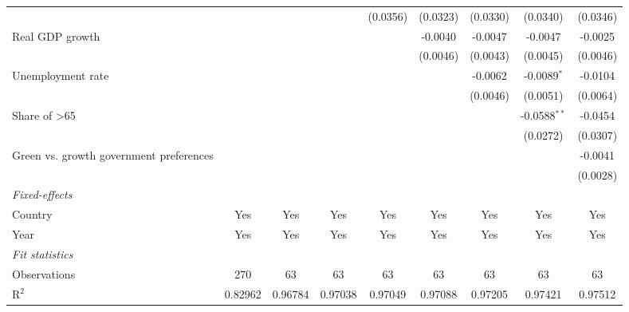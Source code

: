 \begin{table}[htbp]
\begin{tabular}{lcccccccc}
                                                              &          &          &          & (0.0356) & (0.0323) & (0.0330) & (0.0340)       & (0.0346)\\   
      Real GDP growth                                         &          &          &          &          & -0.0040  & -0.0047  & -0.0047        & -0.0025\\   
                                                              &          &          &          &          & (0.0046) & (0.0043) & (0.0045)       & (0.0046)\\   
      Unemployment rate                                       &          &          &          &          &          & -0.0062  & -0.0089$^{*}$  & -0.0104\\   
                                                              &          &          &          &          &          & (0.0046) & (0.0051)       & (0.0064)\\   
      Share of >65                                            &          &          &          &          &          &          & -0.0588$^{**}$ & -0.0454\\   
                                                              &          &          &          &          &          &          & (0.0272)       & (0.0307)\\   
      Green vs. growth government preferences                 &          &          &          &          &          &          &                & -0.0041\\   
                                                              &          &          &          &          &          &          &                & (0.0028)\\   
      \midrule
      \emph{Fixed-effects}\\
      Country                                                 & Yes      & Yes      & Yes      & Yes      & Yes      & Yes      & Yes            & Yes\\  
      Year                                                    & Yes      & Yes      & Yes      & Yes      & Yes      & Yes      & Yes            & Yes\\  
      \midrule
      \emph{Fit statistics}\\
      Observations                                            & 270      & 63       & 63       & 63       & 63       & 63       & 63             & 63\\  
      R$^2$                                                   & 0.82962  & 0.96784  & 0.97038  & 0.97049  & 0.97088  & 0.97205  & 0.97421        & 0.97512\\  

\end{tabular}
\end{table}

